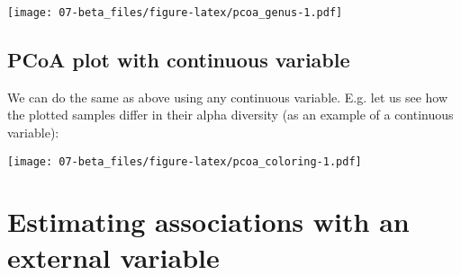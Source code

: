 \documentclass[
  oneside]{book}
\newenvironment{Shaded}{\begin{snugshade}}{\end{snugshade}}
\newcommand{\AttributeTok}[1]{\textcolor[rgb]{0.77,0.63,0.00}{#1}}
\newcommand{\CommentTok}[1]{\textcolor[rgb]{0.56,0.35,0.01}{\textit{#1}}}
\newcommand{\DecValTok}[1]{\textcolor[rgb]{0.00,0.00,0.81}{#1}}
\newcommand{\FunctionTok}[1]{\textcolor[rgb]{0.00,0.00,0.00}{#1}}
\newcommand{\NormalTok}[1]{#1}
\newcommand{\OtherTok}[1]{\textcolor[rgb]{0.56,0.35,0.01}{#1}}
\newcommand{\SpecialCharTok}[1]{\textcolor[rgb]{0.00,0.00,0.00}{#1}}
\newcommand{\StringTok}[1]{\textcolor[rgb]{0.31,0.60,0.02}{#1}}
\begin{document}
\texttt{[image: 07-beta\_files/figure-latex/pcoa\_genus-1.pdf]}

\hypertarget{pcoa-plot-with-continuous-variable}{%
\subsection{PCoA plot with continuous variable}\label{pcoa-plot-with-continuous-variable}}

We can do the same as above using any continuous variable. E.g. let us
see how the plotted samples differ in their alpha diversity (as an
example of a continuous variable):

\begin{Shaded}
\end{Shaded}

\texttt{[image: 07-beta\_files/figure-latex/pcoa\_coloring-1.pdf]}

\hypertarget{estimating-associations-with-an-external-variable}{%
\section{Estimating associations with an external variable}\label{estimating-associations-with-an-external-variable}}
\end{document}
